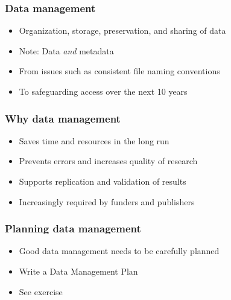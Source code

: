 \documentclass{beamer}
\begin{document}
\begin{frame}
  \frametitle{Data management}
  
  \begin{itemize}
  \item Organization, storage, preservation, and sharing of data 
  \item Note: Data \emph{and} metadata
  \item From issues such as consistent file naming conventions
  \item To safeguarding access over the next 10 years
  \end{itemize}
\end{frame}

\begin{frame}
  \frametitle{Why data management}
  
  \begin{itemize}
    \item Saves time and resources in the long run
    \item Prevents errors and increases quality of research
    \item Supports replication and validation of results
    \item Increasingly required by funders and publishers
  \end{itemize}
\end{frame}

\begin{frame}
  \frametitle{Planning data management}
  
  \begin{itemize}
  \item Good data management needs to be carefully planned
  \item Write a Data Management Plan
  \item See exercise
  \end{itemize}
\end{frame}
\end{document}
